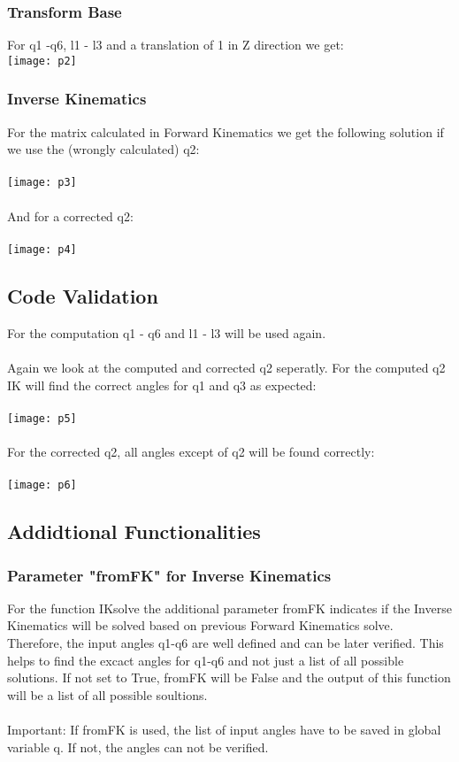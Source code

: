 \documentclass{article}
\begin{document}
	\subsubsection{Transform Base}
	For q1 -q6, l1 - l3 and a translation of 1 in Z direction we get:
	\\
	\texttt{[image: p2]}
	\newpage
	\subsubsection{Inverse Kinematics}
	For the matrix calculated in Forward Kinematics we get the following solution if we use the (wrongly calculated) q2:\\
	\\
	\texttt{[image: p3]}\\
	\\
	And for a corrected q2:\\
	\\
	\texttt{[image: p4]}
	\newpage
	\subsection{Code Validation}
	For the computation q1 - q6 and l1 - l3 will be used again.\\
	\\Again we look at the computed and corrected q2 seperatly. For the computed q2 IK will find the correct angles for q1 and q3 as expected:\\
	\\
	\texttt{[image: p5]}\\
	\\
	For the corrected q2, all angles except of q2 will be found correctly:\\
	\\
	\texttt{[image: p6]}
	\newpage
	\subsection{Addidtional Functionalities}
	\subsubsection{Parameter "fromFK" for Inverse Kinematics}
	For the function IKsolve the additional parameter fromFK indicates if the Inverse Kinematics will be solved based on previous Forward Kinematics solve. Therefore, the input angles q1-q6 are well defined and can be later verified. This helps to find the excact angles for q1-q6 and not just a list of all possible solutions. If not set to True, fromFK will be False and the output of this function will be a list of all possible soultions.\\\\
	Important: If fromFK is used, the list of input angles have to be saved in global variable q. If not, the angles can not be verified.
\end{document}

